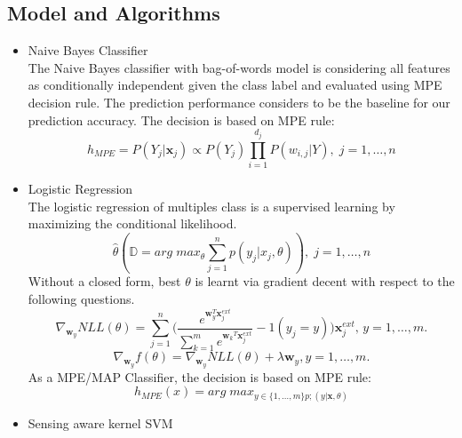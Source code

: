\documentclass[a4paper, 11pt]{article}
\begin{document}
\subsection{Model and Algorithms}
\begin{itemize}
	\item Naive Bayes Classifier\\
	The Naive Bayes classifier with bag-of-words model is considering all features as conditionally independent given the class label and evaluated using MPE decision rule.\cite{ishwarspring18} The prediction performance considers to be the baseline for our prediction accuracy. 
	The decision is based on MPE rule:
	\[h_{MPE} = P(Y_j|\pmb{x}_j) \propto P(Y_j)\prod^{d_j}_{i=1}P(w_{i,j}|Y), \;j = 1,\ldots,n\]
	\item Logistic Regression \\
	The logistic regression of multiples class is a supervised learning by maximizing the conditional likelihood.
	\[\hat{\theta}(\mathbb{D} = arg \; max_\theta \sum_{j=1}^{n}p(y_j|x_j,\theta)), \;j = 1,\ldots,n\]Without a closed form, best $\theta$ is learnt via gradient decent with respect to the following questions. 
	\[\nabla_{\pmb{w}_y}NLL(\theta) = \sum_{j=1}^{n}\bigg(\frac{e^{\pmb{w}_y^T\pmb{x}_j^{ext}}}{\sum_{k=1}^{m}e^{{\pmb{w}_k}^T\pmb{x}_j^{ext}}}-1(y_j = y)\bigg)\pmb{x}^{ext}_{j},\,y=1,\ldots,m.\]
	\[\nabla_{\pmb{w}_y}f(\theta) = \nabla_{\pmb{w}_y}NLL(\theta)+\lambda\pmb{w}_{y},y=1,\ldots,m.\]
	As a MPE/MAP Classifier, the decision is based on MPE rule:\[h_{MPE}(x) = arg \; max_{y \in\{1,\ldots,m\}p;(y|\pmb{x},\theta)}\]
	\item Sensing aware kernel SVM\\
	

\end{itemize}
\end{document}
